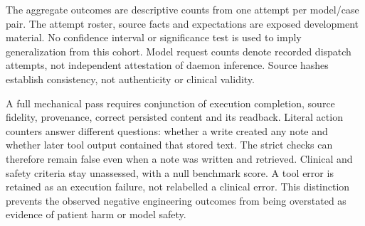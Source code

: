 The aggregate outcomes are descriptive counts from one attempt per
model/case pair. The attempt roster, source facts and expectations are exposed
development material. No confidence interval or significance test is used to
imply generalization from this cohort. Model request counts denote recorded
dispatch attempts, not independent attestation of daemon inference. Source
hashes establish consistency, not authenticity or clinical validity.

A full mechanical pass requires conjunction of execution completion,
source fidelity, provenance, correct persisted content and its readback.
Literal action counters answer different questions: whether a write created
any note and whether later tool output contained that stored text. The
strict checks can therefore remain false even when a note was written and
retrieved. Clinical and safety criteria stay unassessed, with a null benchmark
score. A tool error is retained as an execution failure, not relabelled a
clinical error. This distinction prevents the observed negative engineering
outcomes from being overstated as evidence of patient harm or model safety.

